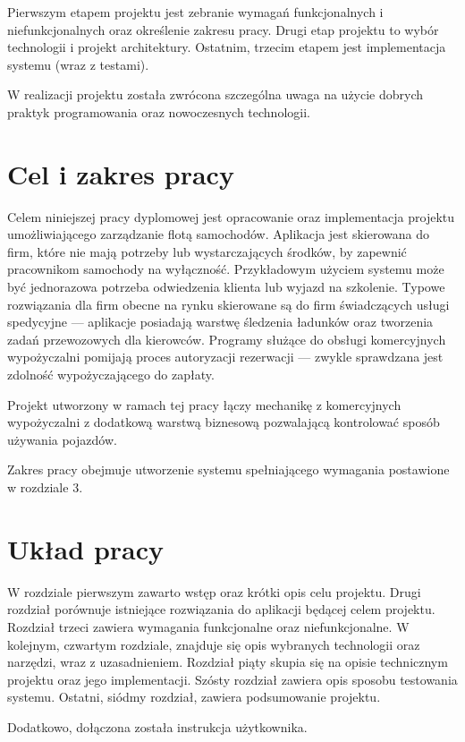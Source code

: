 \documentclass[eng,printmode,openany]{mgr}
\begin{document}
	Pierwszym etapem projektu jest zebranie wymagań funkcjonalnych i niefunkcjonalnych oraz określenie zakresu pracy. Drugi etap projektu to wybór technologii i projekt architektury. Ostatnim, trzecim etapem jest implementacja systemu (wraz z testami).
	
	W realizacji projektu została zwrócona szczególna uwaga na użycie dobrych praktyk programowania oraz nowoczesnych technologii.
	
	\section{Cel i zakres pracy}
	Celem niniejszej pracy dyplomowej jest opracowanie oraz implementacja projektu umożliwiającego zarządzanie flotą samochodów. Aplikacja jest skierowana do firm, które nie mają potrzeby lub wystarczających środków, by zapewnić pracownikom samochody na wyłączność. Przykładowym użyciem systemu może być jednorazowa potrzeba odwiedzenia klienta lub wyjazd na szkolenie. Typowe rozwiązania dla firm obecne na rynku skierowane są do firm świadczących usługi spedycyjne — aplikacje posiadają warstwę śledzenia ładunków oraz tworzenia zadań przewozowych dla kierowców. Programy służące do obsługi komercyjnych wypożyczalni pomijają proces autoryzacji rezerwacji — zwykle sprawdzana jest zdolność wypożyczającego do zapłaty.
	
	Projekt utworzony w ramach tej pracy łączy mechanikę z komercyjnych wypożyczalni z dodatkową warstwą biznesową pozwalającą kontrolować sposób używania pojazdów.
	
	Zakres pracy obejmuje utworzenie systemu spełniającego wymagania postawione w rozdziale 3.
	
	\section{Układ pracy}
	W rozdziale pierwszym zawarto wstęp oraz krótki opis celu projektu. Drugi rozdział porównuje istniejące rozwiązania do aplikacji będącej celem projektu. Rozdział trzeci zawiera wymagania funkcjonalne oraz niefunkcjonalne. W kolejnym, czwartym rozdziale, znajduje się opis wybranych technologii oraz narzędzi, wraz z uzasadnieniem. Rozdział piąty skupia się na opisie technicznym projektu oraz jego implementacji. Szósty rozdział zawiera opis sposobu testowania systemu. Ostatni, siódmy rozdział, zawiera podsumowanie projektu.
	
	Dodatkowo, dołączona została instrukcja użytkownika.
	
	\newpage
\end{document}
